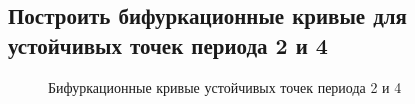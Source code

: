 \documentclass[12pt, a4paper]{article}
\begin{document}
\subsection{Построить бифуркационные кривые для устойчивых точек периода 2 и 4}
\begin{figure}[H]
	\caption{Бифуркационные кривые устойчивых точек периода 2 и 4}
\end{figure}
\end{document}
